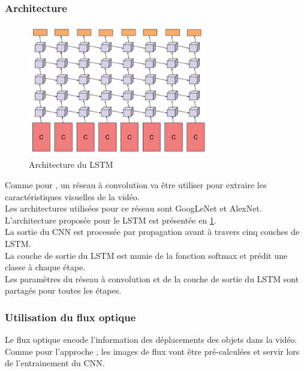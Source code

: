 \documentclass[11pt]{article}
\begin{document}
\subsubsection{Architecture}
\label{sec:orgdf9e2d2}
\begin{figure}[htbp]
\centering
\includegraphics[width=8cm]{cnn_lstm.PNG}
\caption{Architecture du LSTM \label{arch-lstm}}
\end{figure}
Comme pour \cite{DBLP:journals/corr/SimonyanZ14}, un réseau à convolution va être utiliser pour extraire les caractéristiques visuelles de la vidéo.\\
Les architectures utilisées pour ce réseau sont GoogLeNet et AlexNet.\\

L'architecture proposée pour le LSTM est présentée en \ref{arch-lstm}.\\
La sortie du CNN est processée par propagation avant à travers cinq couches de LSTM.\\
La couche de sortie du LSTM est munie de la fonction softmax et prédit une classe à chaque étape.\\
Les paramètres du réseau à convolution et de la couche de sortie du LSTM sont partagés pour toutes les étapes.\\

\subsubsection{Utilisation du flux optique}
\label{sec:orgf130264}
Le flux optique encode l'information des déplacements des objets dans la vidéo.\\
Comme pour l'approche \cite{DBLP:journals/corr/SimonyanZ14}, les images de flux vont être pré-calculées et servir lors de l'entrainement du CNN.\\
\end{document}
